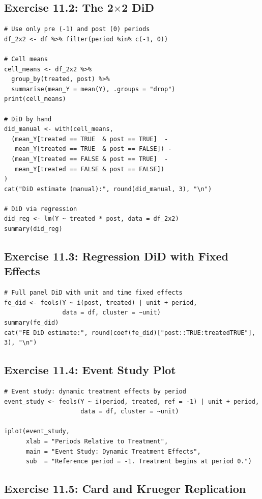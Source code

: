 \subsection{Exercise 11.2: The 2$\times$2 DiD}

\begin{lstlisting}
# Use only pre (-1) and post (0) periods
df_2x2 <- df %>% filter(period %in% c(-1, 0))

# Cell means
cell_means <- df_2x2 %>%
  group_by(treated, post) %>%
  summarise(mean_Y = mean(Y), .groups = "drop")
print(cell_means)

# DiD by hand
did_manual <- with(cell_means,
  (mean_Y[treated == TRUE  & post == TRUE]  -
   mean_Y[treated == TRUE  & post == FALSE]) -
  (mean_Y[treated == FALSE & post == TRUE]  -
   mean_Y[treated == FALSE & post == FALSE])
)
cat("DiD estimate (manual):", round(did_manual, 3), "\n")

# DiD via regression
did_reg <- lm(Y ~ treated * post, data = df_2x2)
summary(did_reg)
\end{lstlisting}

\subsection{Exercise 11.3: Regression DiD with Fixed Effects}

\begin{lstlisting}
# Full panel DiD with unit and time fixed effects
fe_did <- feols(Y ~ i(post, treated) | unit + period,
                data = df, cluster = ~unit)
summary(fe_did)
cat("FE DiD estimate:", round(coef(fe_did)["post::TRUE:treatedTRUE"], 3), "\n")
\end{lstlisting}

\subsection{Exercise 11.4: Event Study Plot}

\begin{lstlisting}
# Event study: dynamic treatment effects by period
event_study <- feols(Y ~ i(period, treated, ref = -1) | unit + period,
                     data = df, cluster = ~unit)

iplot(event_study,
      xlab = "Periods Relative to Treatment",
      main = "Event Study: Dynamic Treatment Effects",
      sub  = "Reference period = -1. Treatment begins at period 0.")
\end{lstlisting}

\subsection{Exercise 11.5: Card and Krueger Replication}


